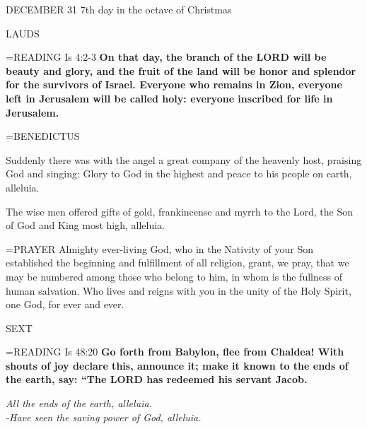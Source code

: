 DECEMBER 31
7th day in the octave of Christmas

\begin{flushleft}\normalsize LAUDS\\\end{flushleft}

\hangindent=\parindent \small{\uppercase{READING}}    Is 4:2-3 \textbf{   On that day, the branch of the LORD will be beauty and glory, and the fruit of the land will be honor and splendor for the survivors of Israel. Everyone who remains in Zion, everyone left in Jerusalem will be called holy: everyone inscribed for life in Jerusalem.\\}

\hangindent=\parindent \small BENEDICTUS	
\begin{description}[labelindent=\parindent, leftmargin=*]
\item [(before the Epiphany):]   Suddenly there was with the angel a great company of the heavenly host, praising God and singing: Glory to God in the highest and peace to his people on earth, alleluia.
\item [(Tuesday after the Epiphany):]  The wise men offered gifts of gold, frankincense and myrrh to the Lord, the Son of God and King most high, alleluia.
\end{description}

\hangindent=\parindent \small{PRAYER 	Almighty ever-living God, who in the Nativity of your Son established the beginning and fulfillment of all religion, grant, we pray, that we may be numbered among those who belong to him, in whom is the fullness of human salvation. Who lives and reigns with you in the unity of the Holy Spirit, one God, for ever and ever.}

\begin{flushleft}\normalsize SEXT\\\end{flushleft}

\hangindent=\parindent \small{\uppercase{READING}}    Is 48:20 \textbf{   Go forth from Babylon, flee from Chaldea! With shouts of joy declare this, announce it; make it known to the ends of the earth, say: “The LORD has redeemed his servant Jacob.\\}

\begin{center}
\textit{All the ends of the earth, alleluia.\\
-Have seen the saving power of God, alleluia.}
\end{center}
